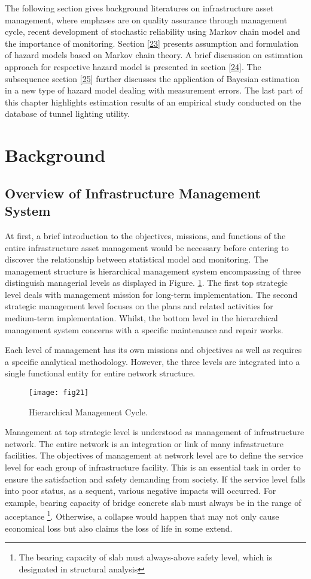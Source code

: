 The following section gives background literatures on infrastructure asset management, where emphases are on quality assurance through management cycle, recent development of stochastic reliability using Markov chain model and the importance of monitoring. Section \ref{23} presents assumption and formulation of hazard models based on Markov chain theory. A brief discussion on estimation approach for respective hazard model is presented in section \ref{24}. The subsequence section \ref{25} further discusses the application of Bayesian estimation in a new type of hazard model dealing with measurement errors. The last part of this chapter highlights estimation results of an empirical study conducted on the database of tunnel lighting utility.
\section{Background}
\label{22}
\subsection{Overview of Infrastructure Management System}
\label{221}
At first, a brief introduction to the objectives, missions, and functions of the entire infrastructure asset management would be necessary before entering to discover the relationship between statistical model and monitoring. The management structure is hierarchical management system encompassing of three distinguish managerial levels as displayed in Figure. \ref{fig21}. The first top strategic level deals with management mission for long-term implementation. The second strategic management level focuses on the plans and related activities for medium-term implementation. Whilst, the bottom level in the hierarchical management system concerns with a specific maintenance and repair works. 

Each level of management has its own missions and objectives as well as requires a specific analytical methodology. However, the three levels are integrated into a single functional entity for entire network structure.
%
\begin{figure}[t]
\begin{center}
\texttt{[image: fig21]} 
\end{center}
\caption{Hierarchical Management Cycle.}
\label{fig21} 
\end{figure}

Management at top strategic level is understood as management of infrastructure network. The entire network is an integration or link of many infrastructure facilities. The objectives of management at network level are to define the service level for each group of infrastructure facility. This is an essential task in order to ensure the satisfaction and safety demanding from society. If the service level falls into poor status, as a sequent, various negative impacts will occurred. For example, bearing capacity of bridge concrete slab must always be in the range of acceptance \footnote{The bearing capacity of slab must always-above safety level, which is designated in structural analysis}. Otherwise, a collapse would happen that may not only cause economical loss but also claims the loss of life in some extend.

